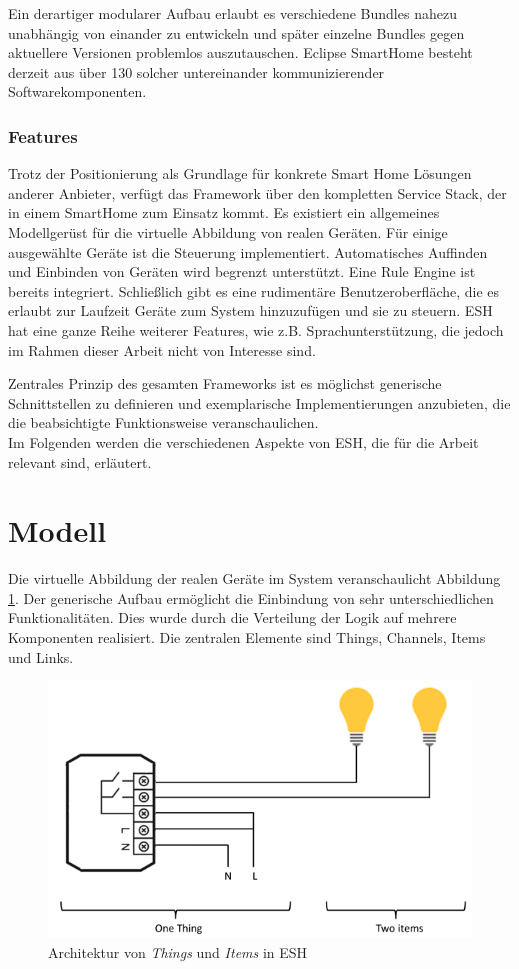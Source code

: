 Ein derartiger modularer Aufbau erlaubt es verschiedene Bundles nahezu unabhängig von einander zu entwickeln und später einzelne Bundles gegen aktuellere Versionen problemlos auszutauschen. Eclipse SmartHome besteht derzeit aus über 130 solcher untereinander kommunizierender Softwarekomponenten.


\subsubsection{Features}
Trotz der Positionierung als Grundlage für konkrete Smart Home Lösungen anderer Anbieter, verfügt das Framework über den kompletten Service Stack, der in einem SmartHome zum Einsatz kommt. Es existiert ein allgemeines Modellgerüst für die virtuelle Abbildung von realen Geräten. Für einige ausgewählte Geräte ist die Steuerung implementiert. Automatisches Auffinden und Einbinden von Geräten wird begrenzt unterstützt. Eine Rule Engine ist bereits integriert. Schließlich gibt es eine rudimentäre Benutzeroberfläche, die es erlaubt zur Laufzeit Geräte zum System hinzuzufügen und sie zu steuern. ESH hat eine ganze Reihe weiterer Features, wie z.B. Sprachunterstützung, die jedoch im Rahmen dieser Arbeit nicht von Interesse sind. 

Zentrales Prinzip des gesamten Frameworks ist es möglichst generische Schnittstellen zu definieren und exemplarische Implementierungen anzubieten, die die beabsichtigte Funktionsweise veranschaulichen. \\

Im Folgenden werden die verschiedenen Aspekte von ESH, die für die Arbeit relevant sind, erläutert.

\section{Modell}
Die virtuelle Abbildung der realen Geräte im System veranschaulicht Abbildung \ref{fig:esh_model}. Der generische Aufbau ermöglicht die Einbindung von sehr unterschiedlichen Funktionalitäten.  Dies wurde durch die Verteilung der Logik auf mehrere Komponenten realisiert. Die zentralen Elemente sind Things, Channels, Items und Links. 

\begin{figure}[h]
	\centering
	\includegraphics[width=\textwidth]{bilder/esh_model}
	\caption{Architektur von \textit{Things} und \textit{Items} in ESH \cite{ESH:home}}
	\label{fig:esh_model}
\end{figure}


